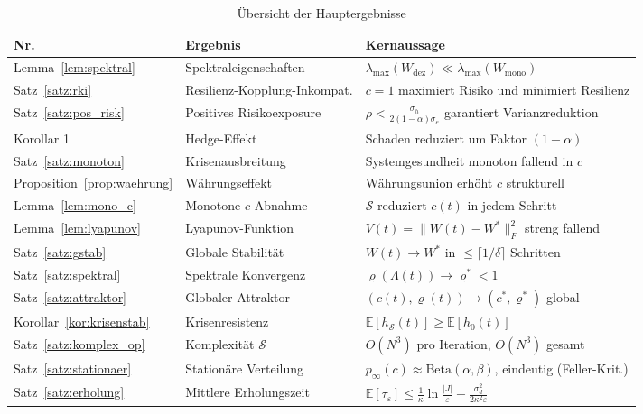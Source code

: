 ﻿\documentclass[a4paper,12pt]{article}
\theoremstyle{definition}
\begin{document}
\begin{table}[H]
\centering
\caption{Übersicht der Hauptergebnisse}
\begin{tabular}{llp{7.0cm}}
\toprule
\textbf{Nr.} & \textbf{Ergebnis} & \textbf{Kernaussage} \\
\midrule
Lemma~\ref{lem:spektral}    & Spektraleigenschaften   & $\lambda_{\max}(W_{\text{dez}}) \ll \lambda_{\max}(W_{\text{mono}})$ \\
Satz~\ref{satz:rki}         & Resilienz-Kopplung-Inkompat. & $c=1$ maximiert Risiko und minimiert Resilienz \\
Satz~\ref{satz:pos_risk}    & Positives Risikoexposure & $\rho < \frac{\sigma_h}{2(1-\alpha)\sigma_e}$ garantiert Varianzreduktion \\
Korollar 1                  & Hedge-Effekt            & Schaden reduziert um Faktor $(1-\alpha)$ \\
Satz~\ref{satz:monoton}     & Krisenausbreitung       & Systemgesundheit monoton fallend in $c$ \\
Proposition~\ref{prop:waehrung} & Währungseffekt      & Währungsunion erhöht $c$ strukturell \\
\midrule
Lemma~\ref{lem:mono_c}      & Monotone $c$-Abnahme    & $\mathcal{S}$ reduziert $c(t)$ in jedem Schritt \\
Lemma~\ref{lem:lyapunov}    & Lyapunov-Funktion       & $V(t)=\|W(t)-W^*\|_F^2$ streng fallend \\
Satz~\ref{satz:gstab}       & Globale Stabilität      & $W(t)\to W^*$ in $\leq\lceil 1/\delta\rceil$ Schritten \\
Satz~\ref{satz:spektral}    & Spektrale Konvergenz    & $\varrho(\Lambda(t))\to\varrho^*<1$ \\
Satz~\ref{satz:attraktor}   & Globaler Attraktor      & $(c(t),\varrho(t))\to(c^*,\varrho^*)$ global \\
Korollar~\ref{kor:krisenstab} & Krisenresistenz       & $\mathbb{E}[h_{\mathcal{S}}(t)]\geq\mathbb{E}[h_0(t)]$ \\
Satz~\ref{satz:komplex_op}  & Komplexität $\mathcal{S}$ & $O(N^3)$ pro Iteration, $O(N^3)$ gesamt \\
\midrule
Satz~\ref{satz:stationaer}  & Stationäre Verteilung     & $p_\infty(c)\approx\mathrm{Beta}(\alpha,\beta)$, eindeutig (Feller-Krit.) \\
Satz~\ref{satz:erholung}    & Mittlere Erholungszeit    & $\mathbb{E}[\tau_\varepsilon]\leq\frac{1}{\kappa}\ln\frac{|J|}{\varepsilon}+\frac{\sigma_d^2}{2\kappa^2\varepsilon}$ \\

\end{tabular}
\end{table}
\end{document}
